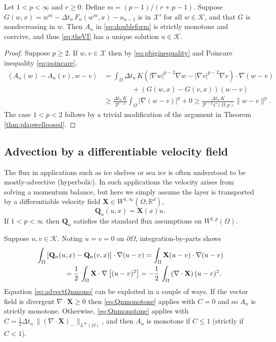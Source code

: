 \documentclass[final,leqno,onefignum,onetabnum]{siamltex1213bueler}
\newcommand\bQ{\mathbf{Q}}
\newcommand\bX{\mathbf{X}}
\newcommand{\Div}{\nabla\cdot}
\renewcommand{\grad}{\nabla}
\newcommand{\ip}[2]{\ensuremath{\left<#1,#2\right>}}
\newcommand\RR{\mathbb{R}}
\begin{document}
\begin{theorem}
Let $1<p<\infty$ and $r\ge 0$.  Define $m = (p-1)/(r+p-1)$.  Suppose $G(w,x)=w^m - \Delta t_n\, F_n(w^m,x) - u_{n-1}$ is in $\mathcal{X}'$ for all $w\in\mathcal{K}$, and that $G$ is nondecreasing in $w$.  Then $A_n$ in \eqref{eq:doubleform} is strictly monotone and coercive, and thus \eqref{eq:theVI} has a unique solution $u\in\mathcal{K}$.
\end{theorem}

\begin{proof}
Suppose $p\ge 2$.  If $w,v\in\mathcal{X}$ then by \eqref{eq:pbiginequality} and Poincare inequality \eqref{eq:poincare},
\begin{align*}
\ip{A_n(w)-A_n(v)}{w-v} &= \int_\Omega \Delta t_n\, K \left(|\grad w|^{p-2} \grad w - |\grad v|^{p-2} \grad v\right) \cdot \grad (w-v) \\
  &\qquad\qquad + \left(G(w,x) - G(v,x)\right) (w-v) \\
  &\ge \frac{\Delta t_n\,K}{2^{p-2}} \int_\Omega |\grad (w-v)|^p + 0 \ge \frac{\Delta t_n\,K}{2^{p-2}\, C(\Omega,p)} \|w-v\|^p.
\end{align*}
The case $1<p<2$ follows by a trivial modification of the argument in Theorem \ref{thm:plapwellposed}.
\end{proof}

\subsection{Advection by a differentiable velocity field} \label{subsec:advect}  The flux in applications such as ice shelves or sea ice is often understood to be mostly-advective (hyperbolic).  In such applications the velocity arises from solving a momentum balance, but here we simply assume the layer is transported by a differentiable velocity field $\bX \in W^{1,\infty}(\Omega;\RR^d)$,
\begin{equation}
  \bQ_n(u,x) = \bX(x) u. \label{eq:advectflux}
\end{equation}
If $1<p<\infty$ then $\bQ_n$ satisfies the standard flux assumptions on $W^{1,p}(\Omega)$.

Suppose $u,v\in\mathcal{K}$.  Noting $u=v=0$ on $\partial \Omega$, integration-by-parts shows
\begin{align}
   &\int_\Omega \left[\bQ_n(u,x) - \bQ_n(v,x)\right] \cdot \grad (u - v) = \int_\Omega \bX (u-v) \cdot \grad (u - v)   \label{eq:advectQnmono} \\
   &\qquad\qquad = \frac{1}{2}\,\int_\Omega \bX \cdot \grad\left[ (u - v)^2 \right] = - \frac{1}{2}\,\int_\Omega \left(\Div\bX\right) (u - v)^2. \notag
\end{align}
Equation \eqref{eq:advectQnmono} can be exploited in a couple of ways.  If the vector field is divergent $\Div\bX\ge 0$ then \eqref{eq:Qnmonotone} applies with $C=0$ and so $A_n$ is strictly monotone.  Otherwise, \eqref{eq:Qnmonotone} applies with $C = \frac{1}{2}\Delta t_n\,\|(\Div\bX)_{-}\|_{L^\infty(\Omega)}$, and then $A_n$ is monotone if $C \le 1$ (strictly if $C < 1$).
\end{document}
